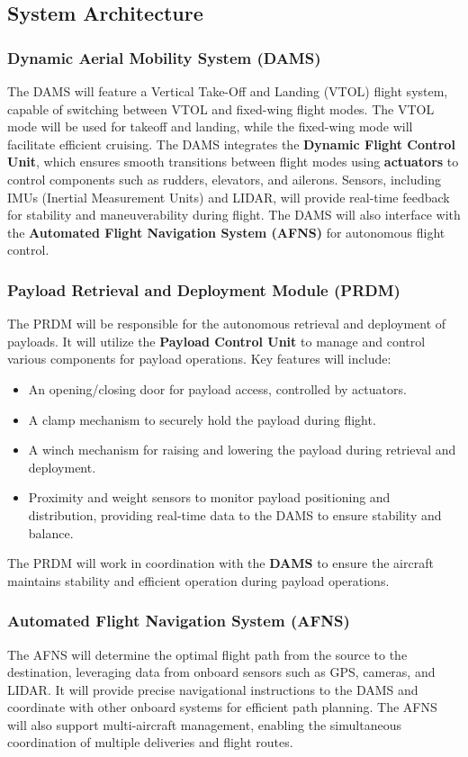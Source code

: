 \documentclass[12pt]{article}
\begin{document}
\subsection{System Architecture}

\subsubsection{Dynamic Aerial Mobility System (DAMS)}
The DAMS will feature a Vertical Take-Off and Landing (VTOL) flight system, capable of switching between VTOL and fixed-wing flight modes. The VTOL mode will be used for takeoff and landing, while the fixed-wing mode will facilitate efficient cruising. The DAMS integrates the \textbf{Dynamic Flight Control Unit}, which ensures smooth transitions between flight modes using \textbf{actuators} to control components such as rudders, elevators, and ailerons. Sensors, including IMUs (Inertial Measurement Units) and LIDAR, will provide real-time feedback for stability and maneuverability during flight. The DAMS will also interface with the \textbf{Automated Flight Navigation System (AFNS)} for autonomous flight control.

\subsubsection{Payload Retrieval and Deployment Module (PRDM)}
The PRDM will be responsible for the autonomous retrieval and deployment of payloads. It will utilize the \textbf{Payload Control Unit} to manage and control various components for payload operations. Key features will include:
\begin{itemize}
    \item An opening/closing door for payload access, controlled by actuators.
    \item A clamp mechanism to securely hold the payload during flight.
    \item A winch mechanism for raising and lowering the payload during retrieval and deployment.
    \item Proximity and weight sensors to monitor payload positioning and distribution, providing real-time data to the DAMS to ensure stability and balance.
\end{itemize}
The PRDM will work in coordination with the \textbf{DAMS} to ensure the aircraft maintains stability and efficient operation during payload operations.

\subsubsection{Automated Flight Navigation System (AFNS)}
The AFNS will determine the optimal flight path from the source to the destination, leveraging data from onboard sensors such as GPS, cameras, and LIDAR. It will provide precise navigational instructions to the DAMS and coordinate with other onboard systems for efficient path planning. The AFNS will also support multi-aircraft management, enabling the simultaneous coordination of multiple deliveries and flight routes.
\end{document}
